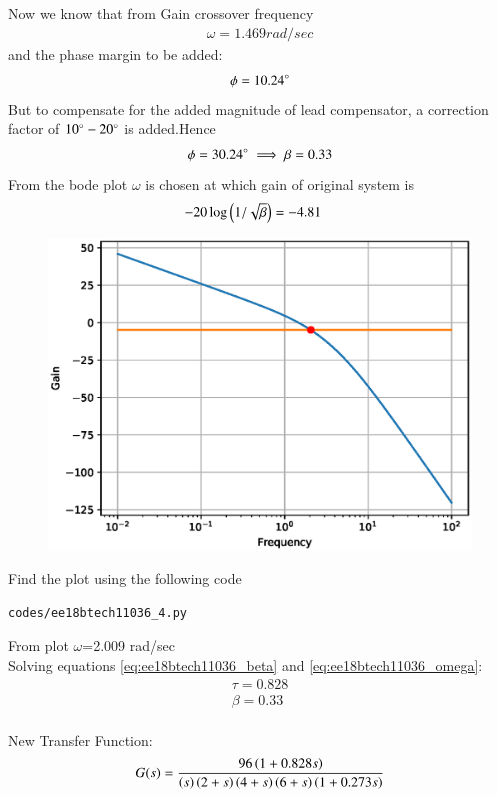 Now we know that from Gain crossover frequency
\begin{align}
\omega =1.469 rad/sec
\end{align}
and the phase margin to be added:
\begin{align}
\phi =10.24\degree
\end{align}
But to compensate for the added magnitude of lead compensator, a correction factor of $10\degree-20\degree$
is added.Hence
\begin{align}
\phi =30.24\degree
\implies \beta=0.33
\end{align}
From the bode plot $\omega$ is chosen at which gain of original system is
\begin{align}
-20\log\left(1/\sqrt{\beta}\right)&=-4.81
\end{align}
\begin{figure}[!ht]
  \centering
  \includegraphics[width=\columnwidth]{./figs/ee18btech11036_3.eps}
  \caption{}
  \label{fig:ee18btech11036_3}
\end{figure}
Find the plot using the following code
\begin{lstlisting}
codes/ee18btech11036_4.py
\end{lstlisting}
From plot $\omega$=2.009 rad/sec\\
Solving equations \ref{eq:ee18btech11036_beta} and \ref{eq:ee18btech11036_omega}:
\begin{align}
\tau= 0.828\\
\beta=0.33\\
\label{eq:ee18btech11036_final}
\end{align}

New Transfer Function:
\begin{align}
G(s)=\frac{96\left(1+ 0.828s\right)}{\left(s\right)\left(2+s\right)\left(4+s\right)\left(6+s\right)\left(1+0.273s\right)}
\end{align}


